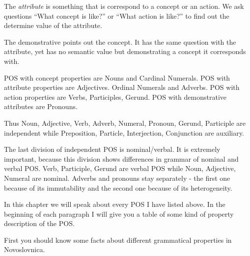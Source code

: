 The \textit{attribute} is something that is correspond to a concept or an action. We ask questions “What concept is like?” or “What action is like?” to find out the determine value of the attribute.

The demonstrative points out the concept. It has the same question with the attribute, yet has no semantic value but demonstrating a concept it corresponds with. 

POS with concept properties are Nouns and Cardinal Numerals. POS with attribute properties are Adjectives. Ordinal Numerals and Adverbs. POS with action properties are Verbs, Participles, Gerund. POS with demonstrative attributes are Pronouns.

Thus Noun, Adjective, Verb, Adverb, Numeral, Pronoun, Gerund, Participle are independent while Preposition, Particle, Interjection, Conjunction are auxiliary.

The last division of independent POS is nominal/verbal. It is extremely important, because this division shows differences in grammar of nominal and verbal POS. Verb, Participle, Gerund are verbal POS while Noun, Adjective, Numeral are nominal. Adverbs and pronouns stay separately - the first one because of its immutability and the second one because of its heterogeneity. 

In this chapter we will speak about every POS I have listed above. In the beginning of each paragraph I will give you a table of some kind of property description of the POS.

First you should know some facts about different grammatical properties in Novoslovnica.


























